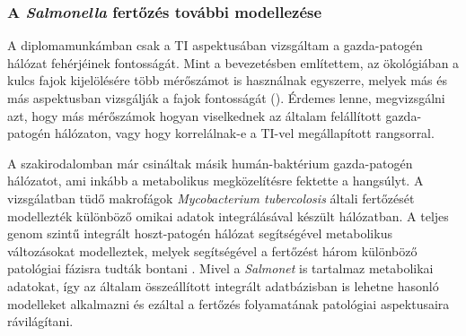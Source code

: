 \documentclass[a4paper,12pt]{article}
\begin{document}
 		\subsubsection{A \textit{Salmonella} fertőzés további modellezése}
		A diplomamunkámban csak a TI aspektusában vizsgáltam a gazda-patogén hálózat fehérjéinek fontosságát. Mint a bevezetésben említettem, az ökológiában a kulcs fajok kijelölésére több mérőszámot is használnak egyszerre, melyek más és más aspektusban vizsgálják a fajok fontosságát \cite{jordan_comparison} (\cite{ti}). Érdemes lenne, megvizsgálni azt, hogy más mérőszámok hogyan viselkednek az általam felállított gazda-patogén hálózaton, vagy hogy korrelálnak-e a TI-vel megállapított rangsorral.
 		
 		A szakirodalomban már csináltak másik humán-baktérium gazda-patogén hálózatot, ami inkább a metabolikus megközelítésre fektette a hangsúlyt. A vizsgálatban tüdő makrofágok \textit{Mycobacterium tubercolosis} általi fertőzését modellezték különböző omikai adatok integrálásával készült hálózatban. A teljes genom szintű integrált hoszt-patogén hálózat segítségével metabolikus változásokat modelleztek, melyek segítségével a fertőzést három különböző patológiai fázisra tudták bontani \cite{discussion_alveolar_macrophage}.  Mivel a \textit{Salmonet} is tartalmaz metabolikai adatokat, így az általam összeállított integrált adatbázisban is lehetne hasonló modelleket alkalmazni és ezáltal a fertőzés folyamatának patológiai aspektusaira rávilágítani.
		
\end{document}
